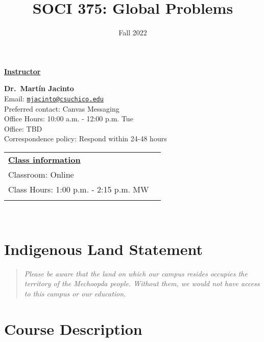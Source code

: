 \documentclass[11pt,]{article}
\title{SOCI 375: Global Problems}
\date{Fall 2022}
\begin{document}
  

		\maketitle
		
	
		\thispagestyle{firststyle}

\textbf{\underline{Instructor}}
\begin{multicols}{2}

  \textbf{Dr.~Martín Jacinto}\\
  Email: \href{mailto:mjacinto@csuchico.edu}{\nolinkurl{mjacinto@csuchico.edu}}\\
  Preferred contact: Canvas Messaging\\
  Office Hours: 10:00 a.m. - 12:00 p.m. Tue\\
  Office: TBD\\
  Correspondence policy: Respond within 24-48 hours\\
    \columnbreak
    
  \end{multicols}
	
\noindent \begin{tabular*}{\textwidth}{ @{\extracolsep{\fill}} lr @{\extracolsep{\fill}}}
\textbf{\underline{Class information}}\\
  Classroom: Online\\
  Class Hours: 1:00 p.m. - 2:15 p.m. MW\\
    \\
	\end{tabular*}\\


\vspace{2mm}


\hypertarget{indigenous-land-statement}{%
\section{Indigenous Land Statement}\label{indigenous-land-statement}}

\begin{quote}
\emph{Please be aware that the land on which our campus resides occupies
the territory of the Mechoopda people. Without them, we would not have
access to this campus or our education.}
\end{quote}

\hypertarget{course-description}{%
\section{Course Description}\label{course-description}}
\end{document}
